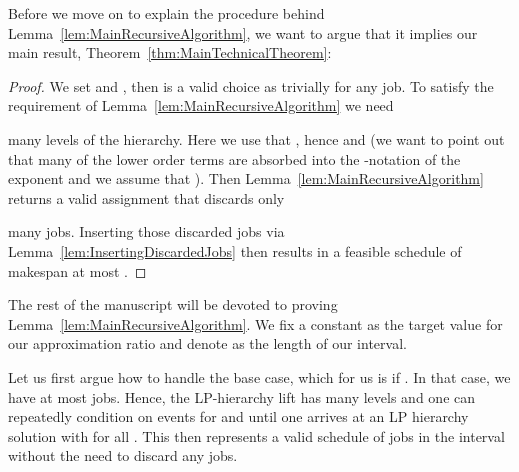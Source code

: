 \documentclass[11pt,letterpaper,oneside,english]{article}
\theoremstyle{theorem}
\begin{document}
Before we move on to explain the procedure behind Lemma~\ref{lem:MainRecursiveAlgorithm}, we 
want to argue that it implies our main result, Theorem~\ref{thm:MainTechnicalTheorem}: 
\begin{proof}
We set  and , then  is a valid choice as trivially 
for any job. To satisfy the requirement of Lemma~\ref{lem:MainRecursiveAlgorithm} we need

many levels of the hierarchy. Here we use that , 
hence  and 
(we want to point out that many of the lower order terms are absorbed into the -notation
of the exponent and we assume that ).
Then Lemma~\ref{lem:MainRecursiveAlgorithm} returns a valid assignment  
that discards only

many jobs. Inserting those discarded jobs via Lemma~\ref{lem:InsertingDiscardedJobs} then
results in a feasible schedule of makespan at most  .
\end{proof}

The rest of the manuscript will be devoted to proving Lemma~\ref{lem:MainRecursiveAlgorithm}. 
We fix a constant  as the target value for our approximation ratio
and denote  as the length of our interval.

Let us first argue how to handle the base case, which for us is if . 
In that case, we have at most  jobs. Hence, the 
LP-hierarchy lift has   many levels and one can repeatedly condition on events
 for  and  until one arrives at an LP hierarchy solution 
with  for all . This then represents a valid schedule of
jobs  in the interval  without the need to discard any jobs.
\end{document}
